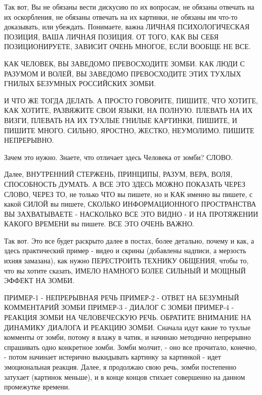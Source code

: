 Так вот, Вы не обязаны вести дискусию по их вопросам, не обязаны отвечать на их
оскорбления, не обязаны отвечать на их картинки, не обязаны им что-то
доказывать, или убеждать. Понимаете, важна ЛИЧНАЯ ПСИХОЛОГИЧЕСКАЯ ПОЗИЦИЯ, ВАША
ЛИЧНАЯ ПОЗИЦИЯ. ОТ ТОГО, КАК ВЫ СЕБЯ ПОЗИЦИОНИРУЕТЕ, ЗАВИСИТ ОЧЕНЬ МНОГОЕ, ЕСЛИ
ВООБЩЕ НЕ ВСЕ.

КАК ЧЕЛОВЕК, ВЫ ЗАВЕДОМО ПРЕВОСХОДИТЕ ЗОМБИ. КАК ЛЮДИ С РАЗУМОМ И ВОЛЕЙ, ВЫ
ЗАВЕДОМО ПРЕВОСХОДИТЕ ЭТИХ ТУХЛЫХ ГНИЛЫХ БЕЗУМНЫХ РОССИЙСКИХ ЗОМБИ.

И ЧТО ЖЕ ТОГДА ДЕЛАТЬ. А ПРОСТО ГОВОРИТЕ, ПИШИТЕ, ЧТО ХОТИТЕ, КАК ХОТИТЕ,
РАЗВЯЖИТЕ СВОИ ЯЗЫКИ, НА ПОЛНУЮ. ПЛЕВАТЬ НА ИХ ВИЗГИ, ПЛЕВАТЬ НА ИХ ТУХЛЫЕ
ГНИЛЫЕ КАРТИНКИ, ПИШИТЕ, И ПИШИТЕ МНОГО. СИЛЬНО, ЯРОСТНО, ЖЕСТКО, НЕУМОЛИМО.
ПИШИТЕ НЕПРЕРЫВНО.

Зачем это нужно. Знаете, что отличает здесь Человека от зомби? СЛОВО.

Далее, ВНУТРЕННИЙ СТЕРЖЕНЬ, ПРИНЦИПЫ, РАЗУМ, ВЕРА, ВОЛЯ, СПОСОБНОСТЬ ДУМАТЬ. А
ВСЕ ЭТО ЗДЕСЬ МОЖНО ПОКАЗАТЬ ЧЕРЕЗ СЛОВО, ЧЕРЕЗ ТО, не только ЧТО вы пишете, но
и КАК именно вы пишете, с какой СИЛОЙ вы пишете, СКОЛЬКО ИНФОРМАЦИОННОГО
ПРОСТРАНСТВА ВЫ ЗАХВАТЫВАЕТЕ - НАСКОЛЬКО ВСЕ ЭТО ВИДНО - И НА ПРОТЯЖЕНИИ КАКОГО
ВРЕМЕНИ вы пишете. ВСЕ ЭТО ОЧЕНЬ ВАЖНО. 

Так вот. Это все будет раскрыто далее в постах, более детально, почему и как, а
здесь практический пример - видео и скрины (добавлены надписи, а мерзость ихняя
замазана), как нужно ПЕРЕСТРОИТЬ ТЕХНИКУ ОБЩЕНИЯ, чтобы то, что вы хотите
сказать, ИМЕЛО НАМНОГО БОЛЕЕ СИЛЬНЫЙ И МОЩНЫЙ ЭФФЕКТ НА ЗОМБИ.

ПРИМЕР-1 - НЕПРЕРЫВНАЯ РЕЧЬ
ПРИМЕР-2 - ОТВЕТ НА БЕЗУМНЫЙ КОММЕНТАРИЙ ЗОМБИ
ПРИМЕР-3 - ДИАЛОГ С ЗОМБИ
ПРИМЕР-4 - РЕАКЦИЯ ЗОМБИ НА ЧЕЛОВЕЧЕСКУЮ РЕЧЬ. ОБРАТИТЕ ВНИМАНИЕ НА ДИНАМИКУ
ДИАЛОГА И РЕАКЦИЮ ЗОМБИ. Сначала идут какие то тухлые комменты от зомби, потому
я влажу в чатик, и начинаю методично  непрерывно спрашивать одно конкретное
зомби. Зомби молчит, - оно все прочитало, конечно, - потом начинает истерично
выкидывать картинку за картинкой - идет эмоциональная реакция. Далее, я
продолжаю свою речь, зомби постепенно затухает (картинок меньше), и в конце
концов стихает совершенно на данном промежутке времени.


